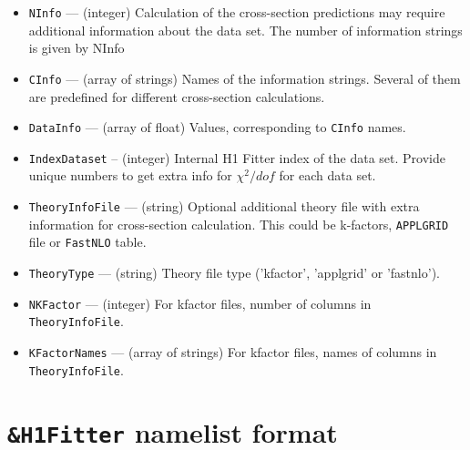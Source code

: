 \documentclass[11pt,a4paper]{article}
\begin{document}
\begin{itemize}
      \item {\tt NInfo}       --- (integer) Calculation of the cross-section predictions may 
                      require  additional information about the data set. The number of 
                      information strings is given by NInfo
      \item {\tt CInfo}       --- (array of strings) Names of the information strings. 
                      Several of them are predefined for different cross-section 
                      calculations.
      \item {\tt DataInfo}    --- (array of float) Values, corresponding to {\tt CInfo} names.
      \item {\tt IndexDataset} -- (integer) Internal H1 Fitter index of the data set. Provide unique
                      numbers to get extra info for $\chi^2/dof$ for each data set.      
      \item {\tt TheoryInfoFile} --- (string) Optional additional theory file with extra 
                     information for cross-section calculation. This could be k-factors,
                     {\tt APPLGRID} file or {\tt FastNLO} table.  
      \item {\tt TheoryType} --- (string) Theory file type ('kfactor', 'applgrid' or 'fastnlo').      
      \item {\tt NKFactor}   --- (integer) For kfactor files, number of columns in
                     {\tt TheoryInfoFile}.
      \item {\tt KFactorNames} --- (array of strings) For kfactor files, names of columns in 
                     {\tt TheoryInfoFile}.
\end{itemize}
\section{{\tt \&H1Fitter} namelist format}
\end{document}
